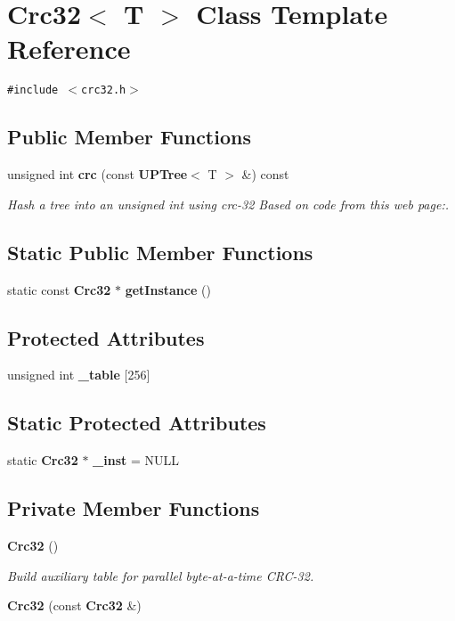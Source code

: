 \section{Crc32$<$ T $>$ Class Template Reference}
\label{classCrc32}
{\tt \#include $<$crc32.h$>$}

\subsection*{Public Member Functions}
\begin{CompactItemize}
\item 
unsigned int {\bf crc} (const {\bf UPTree}$<$ T $>$ \&) const 
\begin{CompactList}\small\item\em Hash a tree into an unsigned int using crc-32 Based on code from this web page:. \item\end{CompactList}\end{CompactItemize}
\subsection*{Static Public Member Functions}
\begin{CompactItemize}
\item 
static const {\bf Crc32} $\ast$ {\bf get\-Instance} ()
\end{CompactItemize}
\subsection*{Protected Attributes}
\begin{CompactItemize}
\item 
unsigned int {\bf \_\-table} [256]
\end{CompactItemize}
\subsection*{Static Protected Attributes}
\begin{CompactItemize}
\item 
static {\bf Crc32} $\ast$ {\bf \_\-inst} = NULL
\end{CompactItemize}
\subsection*{Private Member Functions}
\begin{CompactItemize}
\item 
{\bf Crc32} ()
\begin{CompactList}\small\item\em Build auxiliary table for parallel byte-at-a-time CRC-32. \item\end{CompactList}\item 
{\bf Crc32} (const {\bf Crc32} \&)
\end{CompactItemize}
